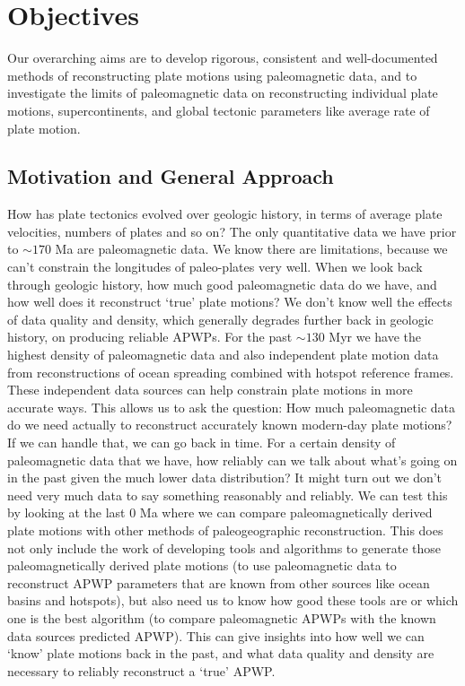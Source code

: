 \section{Objectives}

Our overarching aims are to develop rigorous, consistent and well-documented
methods of reconstructing plate motions using paleomagnetic data, and to
investigate the limits of paleomagnetic data on reconstructing individual plate
motions, supercontinents, and global tectonic parameters like average rate of
plate motion.

\subsection{Motivation and General Approach}

How has plate tectonics evolved over geologic history, in terms of average plate
velocities, numbers of plates and so on? The only quantitative data we have
prior to ${\sim}170$ Ma are paleomagnetic data. We know there are limitations,
because we can't constrain the longitudes of paleo-plates very well. When we
look back through geologic history, how much good paleomagnetic data do we have,
and how well does it reconstruct `true' plate motions? We don't know well the
effects of data quality and density, which generally degrades further back in
geologic history, on producing reliable APWPs. For the past ${\sim}130$
Myr we have the highest density of paleomagnetic data and also independent plate
motion data from reconstructions of ocean spreading combined with hotspot
reference frames. These independent data sources can help constrain plate
motions in more accurate ways. This allows us to ask the question: How much
paleomagnetic data do we need actually to reconstruct accurately known
modern-day plate motions? If we can handle that, we can go back in time. For a
certain density of paleomagnetic data that we have, how reliably can we talk
about what's going on in the past given the much lower data distribution? It
might turn out we don't need very much data to say something reasonably and
reliably. We can test this by looking at the last 0 Ma where we
can compare paleomagnetically derived plate motions with other methods of
paleogeographic reconstruction. This does not only include the work of
developing tools and algorithms to generate those paleomagnetically derived
plate motions (to use paleomagnetic data to reconstruct APWP parameters that are
known from other sources like ocean basins and hotspots), but also need us to
know how good these tools are or which one is the best algorithm (to compare
paleomagnetic APWPs with the known data sources predicted APWP). This can give
insights into how well we can `know' plate motions back in the past, and what
data quality and density are necessary to reliably reconstruct a `true' APWP\@.

